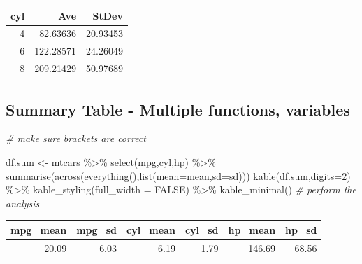\documentclass[
]{book}
\newenvironment{Shaded}{\begin{snugshade}}{\end{snugshade}}
\newcommand{\AttributeTok}[1]{\textcolor[rgb]{0.77,0.63,0.00}{#1}}
\newcommand{\CommentTok}[1]{\textcolor[rgb]{0.56,0.35,0.01}{\textit{#1}}}
\newcommand{\ConstantTok}[1]{\textcolor[rgb]{0.00,0.00,0.00}{#1}}
\newcommand{\DecValTok}[1]{\textcolor[rgb]{0.00,0.00,0.81}{#1}}
\newcommand{\FunctionTok}[1]{\textcolor[rgb]{0.00,0.00,0.00}{#1}}
\newcommand{\NormalTok}[1]{#1}
\newcommand{\OtherTok}[1]{\textcolor[rgb]{0.56,0.35,0.01}{#1}}
\newcommand{\SpecialCharTok}[1]{\textcolor[rgb]{0.00,0.00,0.00}{#1}}
\begin{document}
\begin{table}
\centering
\begin{tabular}{r|r|r}
\hline
cyl & Ave & StDev\\
\hline
4 & 82.63636 & 20.93453\\
\hline
6 & 122.28571 & 24.26049\\
\hline
8 & 209.21429 & 50.97689\\
\hline
\end{tabular}
\end{table}

\hypertarget{summary-table---multiple-functions-variables}{%
\subsection{Summary Table - Multiple functions, variables}\label{summary-table---multiple-functions-variables}}

\begin{Shaded}
\begin{Highlighting}[]
\CommentTok{\# make sure brackets are correct}

\NormalTok{df.sum }\OtherTok{\textless{}{-}}\NormalTok{ mtcars }\SpecialCharTok{\%\textgreater{}\%}  \FunctionTok{select}\NormalTok{(mpg,cyl,hp) }\SpecialCharTok{\%\textgreater{}\%}
  \FunctionTok{summarise}\NormalTok{(}\FunctionTok{across}\NormalTok{(}\FunctionTok{everything}\NormalTok{(),}\FunctionTok{list}\NormalTok{(}\AttributeTok{mean=}\NormalTok{mean,}\AttributeTok{sd=}\NormalTok{sd)))}
\FunctionTok{kable}\NormalTok{(df.sum,}\AttributeTok{digits=}\DecValTok{2}\NormalTok{) }\SpecialCharTok{\%\textgreater{}\%} \FunctionTok{kable\_styling}\NormalTok{(}\AttributeTok{full\_width =} \ConstantTok{FALSE}\NormalTok{) }\SpecialCharTok{\%\textgreater{}\%}
  \FunctionTok{kable\_minimal}\NormalTok{() }\CommentTok{\# perform the analysis}
\end{Highlighting}
\end{Shaded}

\begin{table}
\centering
\begin{tabular}{r|r|r|r|r|r}
\hline
mpg\_mean & mpg\_sd & cyl\_mean & cyl\_sd & hp\_mean & hp\_sd\\
\hline
20.09 & 6.03 & 6.19 & 1.79 & 146.69 & 68.56\\
\hline
\end{tabular}
\end{table}
\end{document}
